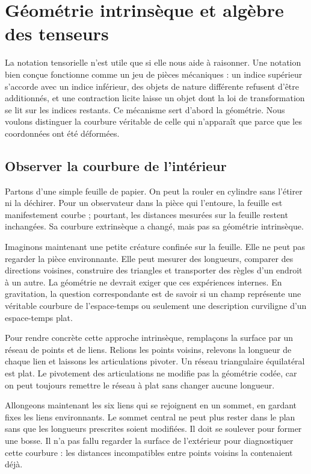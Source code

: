 \chapter{Géométrie intrinsèque et algèbre des tenseurs}

La notation tensorielle n’est utile que si elle nous aide à raisonner.
Une notation bien conçue fonctionne comme un jeu de pièces mécaniques : un indice supérieur s’accorde avec un indice inférieur, des objets de nature différente refusent d’être additionnés, et une contraction licite laisse un objet dont la loi de transformation se lit sur les indices restants. Ce mécanisme sert d’abord la géométrie. Nous voulons distinguer la courbure véritable de celle qui n’apparaît que parce que les coordonnées ont été déformées.

\section{Observer la courbure de l’intérieur}

Partons d’une simple feuille de papier. On peut la rouler en cylindre sans l’étirer ni la déchirer. Pour un observateur dans la pièce qui l’entoure, la feuille est manifestement courbe ; pourtant, les distances mesurées sur la feuille restent inchangées. Sa courbure extrinsèque a changé, mais pas sa géométrie intrinsèque.

Imaginons maintenant une petite créature confinée sur la feuille. Elle ne peut pas regarder la pièce environnante. Elle peut mesurer des longueurs, comparer des directions voisines, construire des triangles et transporter des règles d’un endroit à un autre. La géométrie ne devrait exiger que ces expériences internes. En gravitation, la question correspondante est de savoir si un champ représente une véritable courbure de l’espace-temps ou seulement une description curviligne d’un espace-temps plat.

Pour rendre concrète cette approche intrinsèque, remplaçons la surface par un réseau de points et de liens. Relions les points voisins, relevons la longueur de chaque lien et laissons les articulations pivoter. Un réseau triangulaire équilatéral est plat. Le pivotement des articulations ne modifie pas la géométrie codée, car on peut toujours remettre le réseau à plat sans changer aucune longueur.

Allongeons maintenant les six liens qui se rejoignent en un sommet, en gardant fixes les liens environnants. Le sommet central ne peut plus rester dans le plan sans que les longueurs prescrites soient modifiées. Il doit se soulever pour former une bosse. Il n’a pas fallu regarder la surface de l’extérieur pour diagnostiquer cette courbure : les distances incompatibles entre points voisins la contenaient déjà.

